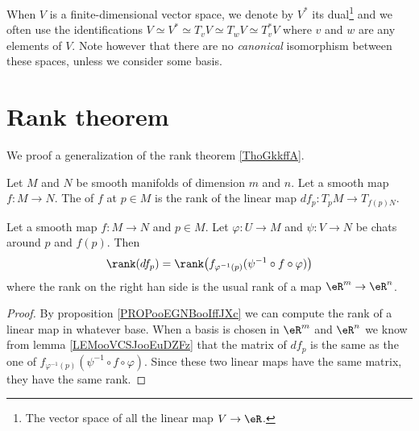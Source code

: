 When $V$ is a finite-dimensional vector space, we denote by $V^*$ its dual\footnote{The vector space of all the linear map $V\to \eR$.} and we often use the identifications $V\simeq V^*\simeq T_vV\simeq T_wV\simeq T^*_vV$ where $v$ and $w$ are any elements of $V$. Note however that there are no \emph{canonical} isomorphism between these spaces, unless we consider some basis.

\section{Rank theorem}

We proof a generalization of the rank theorem \ref{ThoGkkffA}.

\begin{definition}
	Let \( M\) and \( N\) be smooth manifolds of dimension \( m\) and \( n\). Let a smooth map \( f\colon M\to N\). The  of \( f\) at \( p\in M\) is the rank of the linear map \( df_p\colon T_pM\to T_{f(p)N}\).
\end{definition}

\begin{lemma}
	Let a smooth map \( f\colon M\to N\) and \( p\in M\). Let \( \varphi\colon U\to M\) and \( \psi\colon V\to N\) be chats around \( p\) and \( f(p)\). Then
	\begin{equation}
		\rank(df_p)=\rank\big( f_{\varphi^{-1}(p)}(\psi^{-1}\circ f\circ \varphi) \big)
	\end{equation}
	where the rank on the right han side is the usual rank of a map \( \eR^m\to \eR^n\).
\end{lemma}

\begin{proof}
	By proposition \ref{PROPooEGNBooIffJXc} we can compute the rank of a linear map in whatever base. When a basis is chosen in \( \eR^m\) and \( \eR^n\) we know from lemma \ref{LEMooVCSJooEuDZFz} that the matrix of \( df_p\) is the same as the one of \(  f_{\varphi^{-1}(p)}(\psi^{-1}\circ f\circ \varphi) \). Since these two linear maps have the same matrix, they have the same rank.
\end{proof}

